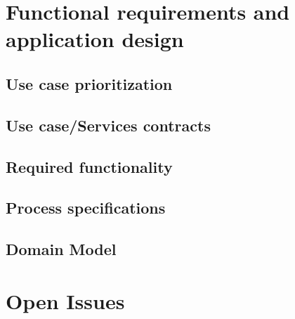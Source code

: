 \documentclass[english]{article}
\begin{document}
	\newpage
	\section{Functional requirements and application design}
		\subsection{Use case prioritization}

		\subsection{Use case/Services contracts}

		\subsection{Required functionality}

		\subsection{Process specifications}

		\subsection{Domain Model}

	\newpage
	\section{Open Issues}
\end{document}
